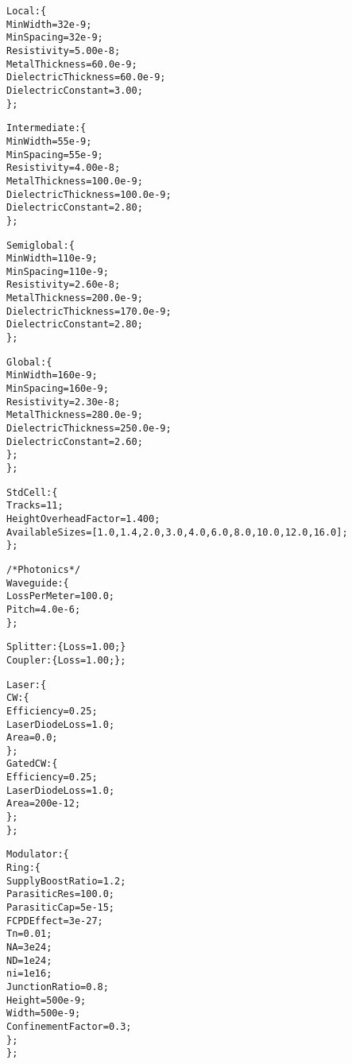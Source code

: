 {\begin{alltt}
                Local: \{
                    MinWidth = 32e-9;
                    MinSpacing = 32e-9;
                    Resistivity = 5.00e-8;
                    MetalThickness = 60.0e-9;
                    DielectricThickness = 60.0e-9;
                    DielectricConstant = 3.00;
                \};
                
                Intermediate: \{
                    MinWidth = 55e-9;
                    MinSpacing = 55e-9;
                    Resistivity = 4.00e-8;
                    MetalThickness = 100.0e-9;
                    DielectricThickness = 100.0e-9;
                    DielectricConstant = 2.80;
                \};
                
                Semiglobal: \{
                    MinWidth = 110e-9;
                    MinSpacing = 110e-9;
                    Resistivity = 2.60e-8;
                    MetalThickness = 200.0e-9;
                    DielectricThickness = 170.0e-9;
                    DielectricConstant = 2.80;
                \};
                
                Global: \{
                    MinWidth = 160e-9;
                    MinSpacing = 160e-9;
                    Resistivity = 2.30e-8;
                    MetalThickness = 280.0e-9;
                    DielectricThickness = 250.0e-9;
                    DielectricConstant = 2.60;
                \};
            \};
            
            StdCell: \{
                Tracks = 11;
                HeightOverheadFactor = 1.400;
                AvailableSizes = [1.0, 1.4, 2.0, 3.0, 4.0, 6.0, 8.0, 10.0, 12.0, 16.0];
            \};
            
            /* Photonics */
            Waveguide: \{
                LossPerMeter = 100.0;
                Pitch = 4.0e-6;
            \};
            
            Splitter: \{ Loss = 1.00; \}
            Coupler: \{ Loss = 1.00; \};
            
            Laser: \{
                CW: \{
                    Efficiency = 0.25;
                    LaserDiodeLoss = 1.0;
                    Area = 0.0;
                \};
                GatedCW: \{
                    Efficiency = 0.25;
                    LaserDiodeLoss = 1.0;
                    Area = 200e-12;
                \};
            \};
            
            Modulator: \{
                Ring: \{
                    SupplyBoostRatio = 1.2;
                    ParasiticRes = 100.0;
                    ParasiticCap = 5e-15;
                    FCPDEffect = 3e-27;
                    Tn = 0.01;
                    NA = 3e24;
                    ND = 1e24;
                    ni = 1e16;
                    JunctionRatio = 0.8;
                    Height = 500e-9;
                    Width = 500e-9;
                    ConfinementFactor = 0.3;
                \};
            \};
            

\end{alltt}}
